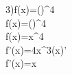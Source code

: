 3)f(x)=\ln\left(\right)^4
\\f(x)=\ln\left(\right)^4
\\f(x)=\ln x^4
\\f'(x)=4\ln x^3\cdot(\ln x)'
\\f'(x)=x
